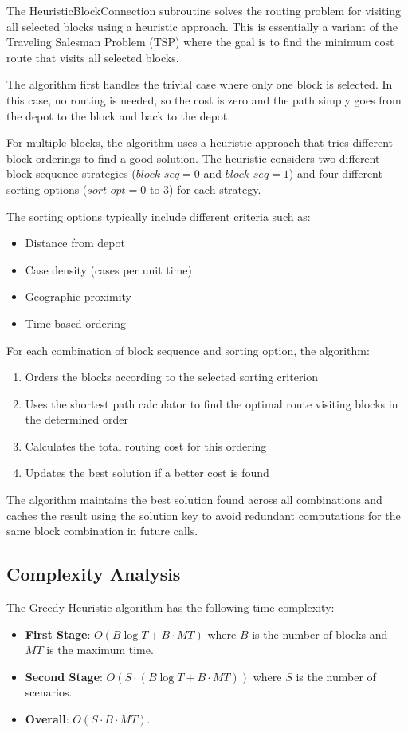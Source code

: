 The HeuristicBlockConnection subroutine solves the routing problem
for visiting all selected blocks using a heuristic approach. This
is essentially a variant of the Traveling Salesman Problem (TSP)
where the goal is to find the minimum cost route that visits all
selected blocks.

The algorithm first handles the trivial case where only one block is selected.
In this case, no routing is needed, so the cost is zero and the path simply
goes from the depot to the block and back to the depot.

For multiple blocks, the algorithm uses a heuristic approach that tries
different block orderings to find a good solution. The heuristic considers
two different block sequence strategies ($block\_seq = 0$ and $block\_seq = 1$)
and four different sorting options ($sort\_opt = 0$ to $3$) for each strategy.

The sorting options typically include different criteria such as:
\begin{itemize}
	\item Distance from depot
	\item Case density (cases per unit time)
	\item Geographic proximity
	\item Time-based ordering
\end{itemize}

For each combination of block sequence and sorting option, the algorithm:
\begin{enumerate}
	\item Orders the blocks according to the selected sorting criterion
	\item Uses the shortest path calculator to find the optimal route visiting blocks in the determined order
	\item Calculates the total routing cost for this ordering
	\item Updates the best solution if a better cost is found
\end{enumerate}

The algorithm maintains the best solution found across all combinations and
caches the result using the solution key to avoid redundant computations for
the same block combination in future calls.

\subsection{Complexity Analysis}

The Greedy Heuristic algorithm has the following time complexity:
\begin{itemize}
	\item \textbf{First Stage}: $O(B \log T + B \cdot MT)$ where $B$ is the number of blocks and $MT$ is the maximum time.
	\item \textbf{Second Stage}: $O(S \cdot (B \log T + B \cdot MT))$ where $S$ is the number of scenarios.
	\item \textbf{Overall}: $O(S \cdot B \cdot MT)$.
\end{itemize}

